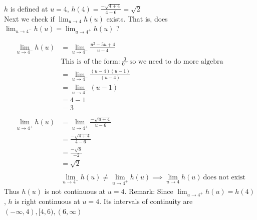 \documentclass[nooutcomes]{ximera}
\begin{document}
\begin{problem}
\begin{enumerate}
\begin{freeResponse}
$h$ is defined at $u=4$, $h(4)=\frac{-\sqrt{4+4}}{4 - 6}=\sqrt{2}$\\
Next we check if  $\lim_{u \to 4} h(u)$ exists.  That is, does $\lim_{u \to 4^-} h(u)=\lim_{u \to 4^+} h(u)$ ?

	\begin{align*}
	\lim_{u \to 4^-} h(u)&=\lim_{u \to 4^-}\frac{u^2-5u+4}{u - 4}\\
	& \text{This is of the form:}\ \frac{0}{0^-}\ \text{so we need to do more algebra}\\
	&=\lim_{u \to 4^-}\frac{(u-4)(u-1)}{(u-4)}\\
	&=\lim_{u \to 4^-}(u-1)\\
	&=4-1\\
	&=3 \\ \\
	\lim_{u \to 4^+} h(u)&=\lim_{u \to 4^+}\frac{-\sqrt{u+4}}{u - 6}\\
	&=\frac{-\sqrt{4+4}}{4 - 6}\\
	&=\frac{-\sqrt{8}}{-2}\\
	&=\sqrt{2}\\ \\
	&\lim_{u \to 4^-} h(u)\ne \lim_{u \to 4^+} h(u) \implies \lim_{u \to 4} h(u)\ \text{does not exist}
	\end{align*}
Thus $h(u)$ is not continuous at $u=4$. Remark: Since $\lim_{u \to 4^+} h(u)=h(4)$, $h$ is right continuous at $u=4$.   Its intervals of continuity are $(-\infty,4),[4,6),(6,\infty)$

	\end{freeResponse}



\end{enumerate}
\end{problem}
								
\end{document}
